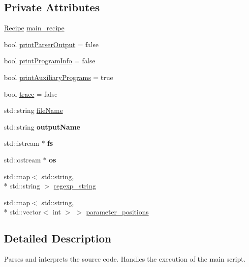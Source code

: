 \subsection*{Private Attributes}
\begin{DoxyCompactItemize}
\item 
\hyperlink{classRecipe}{Recipe} \hyperlink{classProgram_a414bb40153c7da0e1815b7140c4aa454}{main\-\_\-recipe}
\item 
bool \hyperlink{classProgram_a3787a8712d4c75b6b5f0e81a5e4f6fdc}{print\-Parser\-Output} = false
\item 
bool \hyperlink{classProgram_a4addd74ec821dc25e804fa2096b7fa59}{print\-Program\-Info} = false
\item 
bool \hyperlink{classProgram_ad4371cad6bc5c0f4cd232007a2324205}{print\-Auxiliary\-Programs} = true
\item 
bool \hyperlink{classProgram_a5f4a3688d83bf77b92e294933671007c}{trace} = false
\item 
std\-::string \hyperlink{classProgram_ad0706a337cb07f091661cc438e815758}{file\-Name}
\item 
\hypertarget{classProgram_afadb1d59c0b8bd50ab06788adcc3024d}{std\-::string {\bfseries output\-Name}}\label{classProgram_afadb1d59c0b8bd50ab06788adcc3024d}

\item 
\hypertarget{classProgram_a6eccafa4a34736675a5a6740dca64fd7}{std\-::istream $\ast$ {\bfseries fs}}\label{classProgram_a6eccafa4a34736675a5a6740dca64fd7}

\item 
\hypertarget{classProgram_a0d88d35b373765fd6b88a08502569d8b}{std\-::ostream $\ast$ {\bfseries os}}\label{classProgram_a0d88d35b373765fd6b88a08502569d8b}

\item 
std\-::map$<$ std\-::string, \\*
std\-::string $>$ \hyperlink{classProgram_a56696cc6a1e2e75f7b3abcda28fc7a8c}{regexp\-\_\-string}
\item 
std\-::map$<$ std\-::string, \\*
std\-::vector$<$ int $>$ $>$ \hyperlink{classProgram_a7c928870bbd95e8612e9f8efaf7d263b}{parameter\-\_\-positions}
\end{DoxyCompactItemize}


\subsection{Detailed Description}
Parses and interprets the source code. Handles the execution of the main script. 

